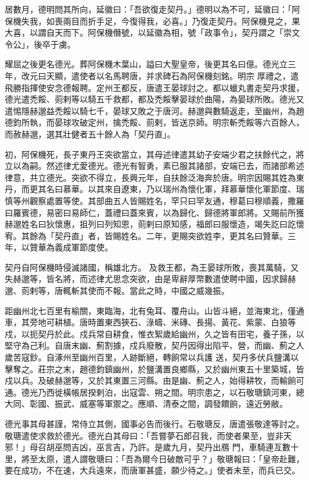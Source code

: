 \begin{pinyinscope}
 居數月，德明問其所向，延徽曰：「吾欲復走契丹。」德明以為不可，延徽曰：「阿保機失我，如喪兩目而折手足，今復得我，必喜。」乃復走契丹。阿保機見之，果大喜，以謂自天而下。阿保機僭號，以延徽為相，號「政事令」，契丹謂之「崇文令公」，後卒于虜。



 耀屈之後更名德光。葬阿保機木葉山，謚曰大聖皇帝，後更其名曰億。德光立三年，改元曰天顯，遣使者以名馬聘唐，并求碑石為阿保機刻銘。明宗
 厚禮之，遣飛勝指揮使安念德報聘。定州王都反，唐遣王晏球討之。都以蠟丸書走契丹求援，德光遣禿餒、荝剌等以騎五千救都，都及禿餒擊晏球於曲陽，為晏球所敗。德光又遣惕隱赫邈益禿餒以騎七千，晏球又敗之于唐河。赫邈與數騎返走，至幽州，為趙德鈞所執，而晏球攻破定州，擒禿餒、荝剌，皆送京師。明宗斬禿餒等六百餘人，而赦赫邈，選其壯健者五十餘人為「契丹直」。



 初，阿保機死，長子東丹王突欲當立，其母述律遣其幼子安端少君之扶餘代之，將立以為嗣。然述律尤愛德光。德光有智勇，素已服其諸部，安端已去，而諸部希述
 律意，共立德光。突欲不得立，長興元年，自扶餘泛海奔於唐。明宗因賜其姓為東丹，而更其名曰慕華。以其來自遼東，乃以瑞州為懷化軍，拜慕華懷化軍節度、瑞慎等州觀察處置等使。其部曲五人皆賜姓名，罕只曰罕友通，穆葛曰穆順義，撒羅曰羅賓德，易密曰易師仁，蓋禮曰蓋來賓，以為歸化、歸德將軍郎將。又賜前所獲赫邈姓名曰狄懷惠，抯列曰列知恩，荝剌曰原知感，福郎曰服懷造，竭失訖曰訖懷宥。其餘為「契丹直」者，皆賜姓名。二年，更賜突欲姓李，更其名曰贊華。三年，以贊華為義成軍節度使。



 契丹自阿保機時侵滅諸國，稱雄北方。
 及救王都，為王晏球所敗，喪其萬騎，又失赫邈等，皆名將，而述律尤思念突欲，由是卑辭厚幣數遣使聘中國，因求歸赫邈、荝剌等，唐輒斬其使而不報。當此之時，中國之威幾振。



 距幽州北七百里有榆關，東臨海，北有兔耳、覆舟山。山皆斗絕，並海東北，僅通車，其旁地可耕植。唐時置東西狹石、淥疇、米磚、長揚、黃花、紫蒙、白狼等戍，以扼契丹於此。戍兵常自耕食，惟衣絮歲給幽州，久之皆有田宅，養子孫，以堅守為己利。自唐末幽、薊割據，戍兵廢散，契丹因得出陷平、營，而幽、薊之人歲苦寇鈔。自涿州至幽州百里，人跡斷絕，轉餉常以兵護
 送，契丹多伏兵鹽溝以擊奪之。莊宗之末，趙德鈞鎮幽州，於鹽溝置良鄉縣，又於幽州東五十里築城，皆戍以兵。及破赫邈等，又於其東置三河縣。由是幽、薊之人，始得耕牧，而輸餉可通。德光乃西徙橫帳居揆剌泊，出寇雲、朔之間。明宗患之，以石敬瑭鎮河東，總大同、彰國、振武、威塞等軍禦之。應順、清泰之間，調發饋餉，遠近勞敝。



 德光事其母甚謹，常侍立其側，國事必告而後行。石敬瑭反，唐遣張敬達等討之。敬瑭遣使求救於德光。德光白其母曰：「吾嘗夢石郎召我，而使者果至，豈非天邪！」母召胡巫問吉凶，巫言吉，乃許。是歲九月，契丹出鴈
 門，車騎連亙數十里，將至太原，遣人謂敬瑭曰：「吾為爾今日破敵可乎？」敬瑭報曰：「皇帝赴難，要在成功，不在速，大兵遠來，而唐軍甚盛，願少待之。」使者未至，而兵已交。




\end{pinyinscope}
